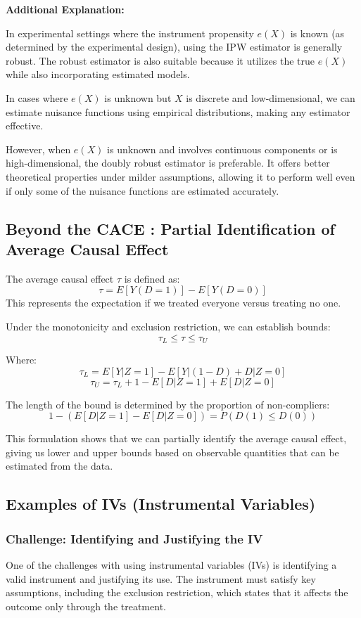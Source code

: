 \textbf{Additional Explanation:} 

In experimental settings where the instrument propensity \(e(X)\) is known (as determined by the experimental design), using the IPW estimator is generally robust. The robust estimator is also suitable because it utilizes the true \(e(X)\) while also incorporating estimated models.

In cases where \(e(X)\) is unknown but \(X\) is discrete and low-dimensional, we can estimate nuisance functions using empirical distributions, making any estimator effective.

However, when \(e(X)\) is unknown and involves continuous components or is high-dimensional, the doubly robust estimator is preferable. It offers better theoretical properties under milder assumptions, allowing it to perform well even if only some of the nuisance functions are estimated accurately.


\subsection{Beyond the CACE
: Partial Identification of Average Causal Effect}

The average causal effect \(\tau\) is defined as:
\[
\tau = E[Y(D=1)] - E[Y(D=0)]
\]
This represents the expectation if we treated everyone versus treating no one.

Under the monotonicity and exclusion restriction, we can establish bounds:
\[
\tau_L \leq \tau \leq \tau_U
\]

Where:
\[
\tau_L = E[Y | Z=1] - E[Y | (1-D) + D | Z=0]
\]
\[
\tau_U = \tau_L + 1 - E[D | Z=1] + E[D | Z=0]
\]

The length of the bound is determined by the proportion of non-compliers:
\[
1 - (E[D | Z=1] - E[D | Z=0]) = P(D(1) \leq D(0))
\]

This formulation shows that we can partially identify the average causal effect, giving us lower and upper bounds based on observable quantities that can be estimated from the data. 


\newpage
\subsection{Examples of IVs (Instrumental Variables)}

\subsubsection{Challenge: Identifying and Justifying the IV}
One of the challenges with using instrumental variables (IVs) is identifying a valid instrument and justifying its use. The instrument must satisfy key assumptions, including the exclusion restriction, which states that it affects the outcome only through the treatment.

